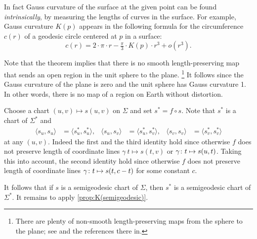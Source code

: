 In fact Gauss curvature of the surface at the given point can be found {}\emph{intrinsically},
by measuring the lengths of curves in the surface.
For example, Gauss curvature $K(p)$ appears in the following formula for the circumference $c(r)$ of a geodesic circle centered at $p$ in a surface: 
\[c(r)=2\cdot\pi\cdot r-\tfrac\pi3\cdot K(p)\cdot r^3+o(r^3).\]

Note that the theorem implies that there is no smooth length-preserving map that sends an open region in the unit sphere to the plane.%
\footnote{There are plenty of non-smooth length-preserving maps from the sphere to the plane; see \cite{petrunin-yashinski} and the references there in.}
It follows since the Gauss curvature of the plane is zero and the unit sphere has Gauss curvature 1. 
In other words, there is no map of a region on Earth without distortion.

 Choose a chart $(u,v)\mapsto s(u,v)$ on $\Sigma$ and set
$s^{*} =f\circ s$.
Note that $s^{*}$ is a chart of $\Sigma^{*}$ and 
\begin{align*}
\langle s_u,s_u\rangle
&=
\langle s_u^{*}, s_u^{*}\rangle,
&
\langle s_u, s_v\rangle
&=
\langle s_u^{*}, s_v^{*}\rangle,
&
\langle s_v, s_v\rangle
&=
\langle s_v^{*}, s_v^{*}\rangle
\end{align*}
at any $(u,v)$.
Indeed the first and the third identity hold since otherwise $f$ does not preserve length of coordinate lines $\gamma\:t\mapsto s(t,v)$ or  $\gamma\:t\z\mapsto s(u,t)$.
Taking this into account, the second identity hold since otherwise $f$ does not preserve length of coordinate lines $\gamma\:t\z\mapsto s(t,c-t)$ for some constant $c$.

It follows that if $s$ is a semigeodesic chart of $\Sigma$,
then $s^{*}$ is a semigeodesic chart of $\Sigma^{*}$.
It remains to apply \ref{prop:K(semigeodesic)}.
\qeds
